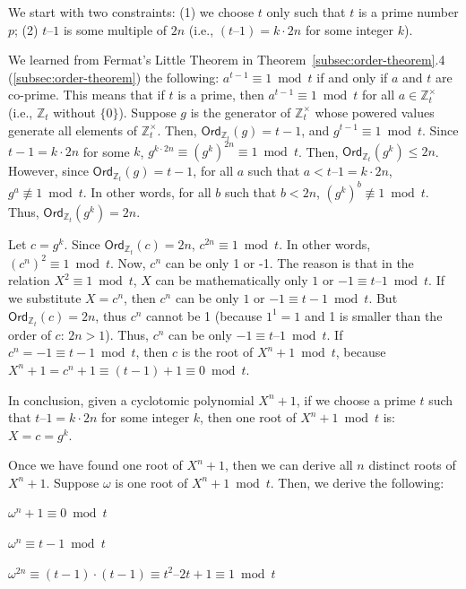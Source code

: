 We start with two constraints: (1) we choose $t$ only such that $t$ is a prime number $p$; (2) $t – 1$ is some multiple of $2n$ (i.e., $(t – 1) = k \cdot 2n$ for some integer $k$). 

We learned from Fermat's Little Theorem in Theorem~\ref*{subsec:order-theorem}.4 (\autoref{subsec:order-theorem}) the following: $a^{t - 1} \equiv 1 \bmod t$ if and only if $a$ and $t$ are co-prime. This means that if $t$ is a prime, then $a^{t - 1} \equiv 1 \bmod t$ for all $a \in \mathbb{Z}_t^{\times}$ (i.e., $\mathbb{Z}_t$ without $\{0\}$). Suppose $g$ is the generator of $\mathbb{Z}_t^{\times}$ whose powered values generate all elements of $\mathbb{Z}_t^{\times}$. Then, $\textsf{Ord}_{\mathbb{Z}_t}(g) = t - 1$, and $g^{t - 1} \equiv 1 \bmod t$. Since $t - 1 = k \cdot 2n$ for some $k$, $g^{k\cdot2n} \equiv (g^{k})^{2n} \equiv 1 \bmod t$. Then, $\textsf{Ord}_{\mathbb{Z}_t}(g^{k}) \leq 2n$. However, since $\textsf{Ord}_{\mathbb{Z}_t}(g) = t - 1$, for all $a$ such that $a < t – 1 = k \cdot 2n$, $g^a \not\equiv 1 \bmod t$. In other words, for all $b$ such that $b < 2n$, $(g^k)^b \not\equiv 1 \bmod t$. Thus, $\textsf{Ord}_{\mathbb{Z}_t}(g^{k}) = 2n$. 

Let $c = g^k$. Since $\textsf{Ord}_{\mathbb{Z}_t}(c) = 2n$, $c^{2n} \equiv 1 \bmod t$. In other words, $(c^n)^2 \equiv 1 \bmod t$. 
Now, $c^n$ can be only 1 or -1. The reason is that in the relation $X^2 \equiv 1 \bmod t$, $X$ can be mathematically only $1$ or $-1 \equiv t – 1 \bmod t$. If we substitute $X = c^n$, then $c^n$ can be only $1$ or $-1 \equiv t - 1 \bmod t$. But $\textsf{Ord}_{\mathbb{Z}_t}(c) = 2n$, thus $c^n$ cannot be 1 (because $1^1 = 1$ and 1 is smaller than the order of $c$: $2n > 1$). Thus, $c^n$ can be only $-1 \equiv t – 1 \bmod t$. If $c^n = -1 \equiv t - 1 \bmod t$, then $c$ is the root of $X^n + 1 \bmod t$, because $X^n + 1 = c^n + 1 \equiv (t - 1) + 1 \equiv 0 \bmod t$. 

In conclusion, given a cyclotomic polynomial $X^n + 1$, if we choose a prime $t$ such that $t – 1 = k \cdot 2n$ for some integer $k$, then one root of $X^n + 1 \bmod t$ is: $X = c = g^k$. 

Once we have found one root of $X^n + 1$, then we can derive all $n$ distinct roots of $X^n + 1$. Suppose $\omega$ is one root of $X^n + 1 \bmod t$. Then, we derive the following:

$\omega^n + 1 \equiv 0 \bmod t$

$\omega^n \equiv t - 1 \bmod t$

$\omega^{2n} \equiv (t - 1)\cdot(t - 1) \equiv  t^2 – 2t + 1 \equiv   1 \bmod t$

